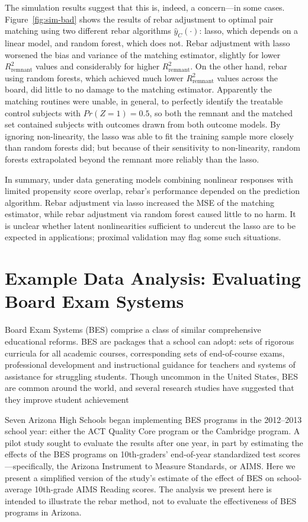 \documentclass[12pt]{article}\usepackage[]{graphicx}\usepackage[]{color}
\newcommand{\algorithm}{\hat{y}_C(\cdot)}
\begin{document}
The simulation results suggest that this is, indeed, a concern---in
some cases.
Figure~\ref{fig:sim-bad} shows the results of rebar adjustment to
optimal pair matching using two different rebar algorithms $\algorithm$: lasso,
which depends on a linear model, and random forest, which does not.
Rebar adjustment with lasso worsened the bias and variance of the matching
estimator, slightly for lower $R^2_{\text{remnant}}$ values and considerably
for higher $R^2_{\text{remnant}}$.
On the other hand, rebar using random forests, which achieved much
lower $R^2_{\text{remnant}}$ values across the board, did little to no damage
to the matching estimator.
Apparently the matching routines were
unable, in general, to perfectly identify the treatable control subjects with
$Pr(Z=1)=0.5$, so both the remnant and the matched set contained
subjects with outcomes drawn from both outcome models.
By ignoring non-linearity, the lasso was able to fit the training
sample more closely than random forests did; but because of their
sensitivity to non-linearity, random forests extrapolated beyond the
remnant more reliably than the lasso.

In summary, under data generating models combining nonlinear responses with
limited propensity score overlap, rebar's performance depended on the
prediction algorithm.
Rebar adjustment via lasso increased the MSE
of the matching estimator, while rebar adjustment via random forest
caused little to no harm.   It is unclear whether latent nonlinearities sufficient to undercut the
lasso are to be expected in applications; proximal validation may flag
some such situations.


\section{Example Data Analysis: Evaluating Board Exam Systems}\label{sec:example}

Board Exam Systems (BES) comprise a class of similar comprehensive educational reforms.
BES are packages that a school can adopt: sets of rigorous curricula for all academic courses, corresponding sets of end-of-course exams, professional development and instructional guidance for teachers and systems of assistance for struggling students.
Though uncommon in the United States, BES are common around the world, and several research studies have suggested that they improve student achievement \citep{bishop1997effect,bishop2000curriculum, collier2009institutional}

Seven Arizona High Schools began implementing BES programs in the
2012--2013 school year: either the ACT Quality
Core program or the Cambridge program.
A pilot study sought to evaluate the results after one year, in part by
estimating the effects of the BES programs on 10th-graders' end-of-year standardized test
scores---specifically, the Arizona Instrument to Measure Standards, or AIMS.
Here we present a simplified version of the study's estimate of the effect of BES on school-average 10th-grade AIMS Reading scores.
The analysis we present here is intended to illustrate the rebar method, not to evaluate the effectiveness of BES programs in Arizona.
\end{document}

